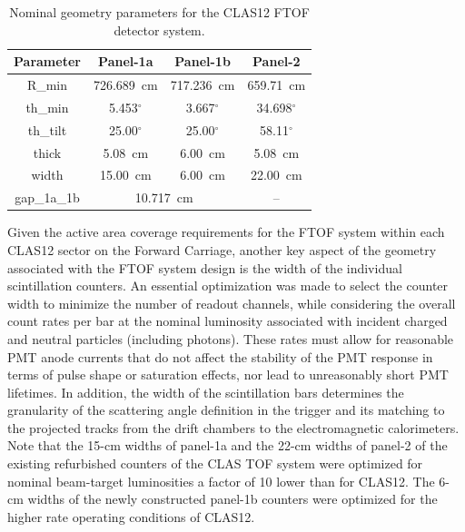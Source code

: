 \documentclass[final,3p,twocolumn]{elsarticle}
\begin{document}
\begin{table}[htbp]
\begin{center}
\begin{tabular} {c|c|c|c} \hline
Parameter & Panel-1a &  Panel-1b & Panel-2 \\ \hline
R\_min      & 726.689~cm & 717.236~cm & 659.71~cm \\ \hline
th\_min    & 5.453$^\circ$ & 3.667$^\circ$ & 34.698$^\circ$ \\ \hline
th\_tilt    & 25.00$^\circ$ & 25.00$^\circ$ & 58.11$^\circ$ \\ \hline
thick        & 5.08~cm           & 6.00~cm         & 5.08~cm \\ \hline
width       & 15.00~cm         & 6.00~cm         & 22.00~cm \\ \hline
gap\_1a\_1b & \multicolumn{2}{c|}{10.717~cm} &  -- \\ \hline
\end{tabular}
\caption{Nominal geometry parameters for the CLAS12 FTOF detector system.}
\label{geom-parms}
\end{center}
\end{table}

Given the active area coverage requirements for the FTOF system within each CLAS12 sector on the
Forward Carriage, another key aspect of the geometry associated with the FTOF system design is
the width of the individual scintillation counters. An essential optimization was made to select the
counter width to minimize the number of readout channels, while considering the overall count rates per
bar at the nominal luminosity associated with incident charged and neutral particles (including photons).
These rates must allow for reasonable PMT anode currents that do not affect the stability of the PMT
response in terms of pulse shape or saturation effects, nor lead to unreasonably short PMT lifetimes.
In addition, the width of the scintillation bars determines the granularity of the scattering angle definition
in the trigger and its matching to the projected tracks from the drift chambers to the electromagnetic
calorimeters. Note that the 15-cm widths of panel-1a and the 22-cm widths of panel-2 of the existing
refurbished counters of the CLAS TOF system were optimized for nominal beam-target luminosities a
factor of 10 lower than for CLAS12. The 6-cm widths of the newly constructed panel-1b counters were
optimized for the higher rate operating conditions of CLAS12.
\end{document}

